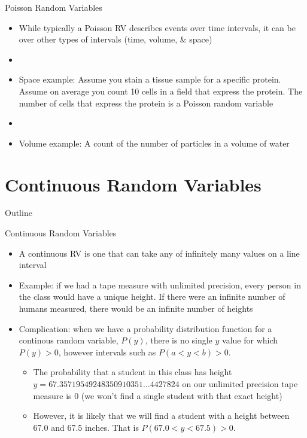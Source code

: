 \documentclass[xcolor=dvipsnames]{beamer}
\begin{document}
\begin{frame}{Poisson Random Variables}
	\begin{itemize}
		\item While typically a Poisson RV describes events over time intervals, it can be over other types of intervals (time, volume, \& space) \pause
		\item[]
		\item Space example: Assume you stain a tissue sample for a specific protein. Assume on average you count 10 cells in a field that express the protein. The number of cells that express the protein is a Poisson random variable \pause
		\item[]
		\item Volume example: A count of the number of particles in a volume of water
	\end{itemize}
\end{frame}

\section{Continuous Random Variables}
\begin{frame}{Outline}
	\tableofcontents[currentsection,subsectionstyle=show/shaded/hide]
\end{frame}

\begin{frame}{Continuous Random Variables}
	\begin{itemize}
	\item A continuous RV is one that can take any of infinitely many values on a line interval \pause
	\item Example: if we had a tape measure with unlimited precision, every person in the class would have a unique height. If there were an infinite number of humans measured, there would be an infinite number of heights \pause
	
	\item Complication: when we have a probability distribution function for a continous random variable, $P(y)$, there is no single $y$ value for which $P(y) > 0$,
	however intervals such as $P(a<y<b) > 0$. \pause
	\begin{itemize}
		\item The probability that a student in this class has height $y = 67.35719549248350910351...4427824$ on our unlimited precision tape measure is 0 (we won't find a single student with that exact height) \pause
		\item However, it is likely that we will find a student with a height between 67.0 and 67.5 inches. That is $P(67.0 < y < 67.5) > 0$. 
	\end{itemize}
\end{itemize}
\end{frame}
\end{document}
